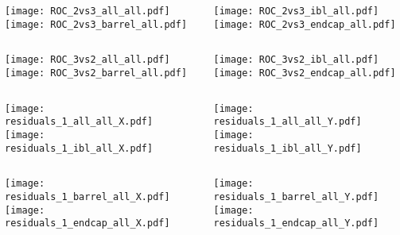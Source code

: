 \documentclass{beamer}
\begin{document}
\begin{frame}
\begin{columns}
\begin{column}{0.45\textwidth}
\texttt{[image: ROC\_2vs3\_all\_all.pdf]} \\ \vfill
\texttt{[image: ROC\_2vs3\_barrel\_all.pdf]}
\end{column}
\begin{column}{0.45\textwidth}
\texttt{[image: ROC\_2vs3\_ibl\_all.pdf]} \\ \vfill
\texttt{[image: ROC\_2vs3\_endcap\_all.pdf]}
\end{column}
\end{columns}
\end{frame}
\begin{frame}
\begin{columns}
\begin{column}{0.45\textwidth}
\texttt{[image: ROC\_3vs2\_all\_all.pdf]} \\ \vfill
\texttt{[image: ROC\_3vs2\_barrel\_all.pdf]}
\end{column}
\begin{column}{0.45\textwidth}
\texttt{[image: ROC\_3vs2\_ibl\_all.pdf]} \\ \vfill
\texttt{[image: ROC\_3vs2\_endcap\_all.pdf]}
\end{column}
\end{columns}
\end{frame}
\begin{frame}
\begin{columns}
\begin{column}{0.45\textwidth}
\texttt{[image: residuals\_1\_all\_all\_X.pdf]} \\ \vfill
\texttt{[image: residuals\_1\_ibl\_all\_X.pdf]}
\end{column}
\begin{column}{0.45\textwidth}
\texttt{[image: residuals\_1\_all\_all\_Y.pdf]} \\ \vfill
\texttt{[image: residuals\_1\_ibl\_all\_Y.pdf]}
\end{column}
\end{columns}
\end{frame}
\begin{frame}
\begin{columns}
\begin{column}{0.45\textwidth}
\texttt{[image: residuals\_1\_barrel\_all\_X.pdf]} \\ \vfill
\texttt{[image: residuals\_1\_endcap\_all\_X.pdf]}
\end{column}
\begin{column}{0.45\textwidth}
\texttt{[image: residuals\_1\_barrel\_all\_Y.pdf]} \\ \vfill
\texttt{[image: residuals\_1\_endcap\_all\_Y.pdf]}
\end{column}
\end{columns}
\end{frame}
\end{document}
